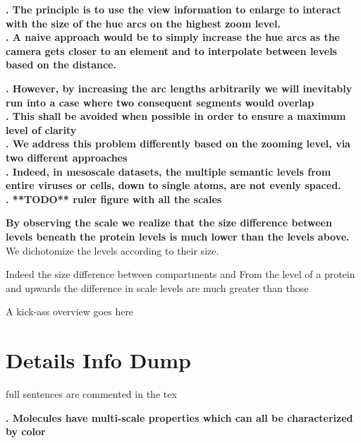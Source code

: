 \documentclass[review,journal]{vgtc}         %
\begin{document}
\textbf{. The principle is to use the view information to enlarge to interact with the size of the hue arcs on the highest zoom level.} \\

\textbf{. A naive approach would be to simply increase the hue arcs as the camera gets closer to an element and to interpolate between levels based on the distance. }

\textbf{. However, by increasing the arc lengths arbitrarily we will inevitably run into a case where two consequent segments would overlap } \\

\textbf{. This shall be avoided when possible in order to ensure a maximum level of clarity } \\


\textbf{. We address this problem differently based on the zooming level, via two different approaches} \\

\textbf{. Indeed, in mesoscale datasets, the multiple semantic levels from entire viruses or cells, down to single atoms, are not evenly spaced.} \\

\textbf{ . **TODO** ruler figure with all the scales}


\textbf{By observing the scale we realize that the size difference between levels beneath the protein levels is much lower than the levels above.} \\

We dichotomize the levels according to their size.



Indeed the size difference between compartments and 
From the level of a protein and upwards the difference in scale levels are much greater than those 
 

A kick-ass overview goes here

\section{Details Info Dump}

full sentences are commented in the tex

\textbf{. Molecules have multi-scale properties which can all be characterized by color } \\

\end{document}
